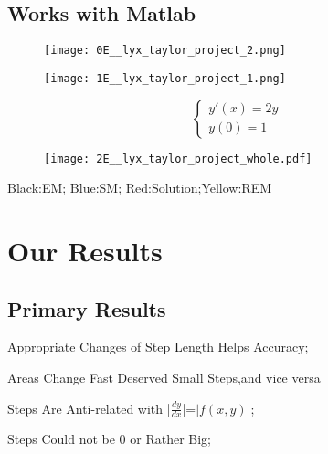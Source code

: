 \documentclass[english]{beamer}
\def\lyxframeend{} %
\begin{document}
\lyxframeend{}\subsection{Works with Matlab}


\lyxframeend{}

\begin{figure}
\caption{\protect\texttt{[image: 0E\_\_lyx\_taylor\_project\_2.png]}}
\end{figure}



\lyxframeend{}

\begin{figure}
\caption{\protect\texttt{[image: 1E\_\_lyx\_taylor\_project\_1.png]}}
\end{figure}



\lyxframeend{}

\[
\left\{ \begin{array}{ll}
y'(x)=2y\\
y(0)=1
\end{array}\right.
\]


\begin{figure}
\caption{\protect\texttt{[image: 2E\_\_lyx\_taylor\_project\_whole.pdf]}}
\end{figure}


Black:EM; Blue:SM; Red:Solution;Yellow:REM


\lyxframeend{}\section{Our Results}


\lyxframeend{}\subsection{Primary Results}


\lyxframeend{}
\begin{fact}%
Appropriate Changes of Step Length Helps Accuracy;

Areas Change Fast Deserved Small Steps,and vice versa\end{fact}%
\begin{corollary}%
Steps Are Anti-related with |$\frac{dy}{dx}$|=$|f(x,y)|$;\end{corollary}%
\begin{fact}%
Steps Could not be 0 or Rather Big;
\end{fact}%
\end{document}
